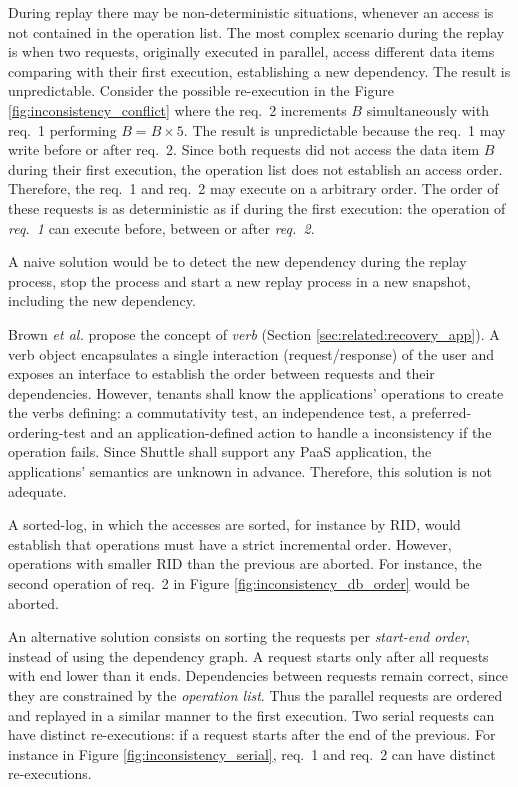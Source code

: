 During replay there may be non-deterministic situations, whenever an access is not contained in the operation list. The most complex scenario during the replay is when two requests, originally executed in parallel, access different data items comparing with their first execution, establishing a new dependency. The result is unpredictable. Consider the possible re-execution in the Figure \ref{fig:inconsistency_conflict} where the {req.~2} increments $B$ simultaneously with {req.~1} performing $B = B \times 5$. The result is unpredictable because the {req.~1} may write before or after {req.~2}. Since both requests did not access the data item $B$ during their first execution, the operation list does not establish an access order. Therefore, the {req.~1} and {req.~2} may execute on a arbitrary order. The order of these requests is as deterministic as if during the first execution: the operation of \emph{req.~1} can execute before, between or after \emph{req.~2}.


A naive solution would be to detect the new dependency during the replay process, stop the process and start a new replay process in a new snapshot, including the new dependency.

Brown \textit{et al.} \cite{undoForOperators} propose the concept of \textit{verb} (Section \ref{sec:related:recovery_app}). A verb object encapsulates a single interaction (request/response) of the user and exposes an interface to establish the order between requests and their dependencies. However, tenants shall know the applications' operations to create the verbs defining: a commutativity test, an independence test, a preferred-ordering-test and an application-defined action to handle a inconsistency if the operation fails. Since Shuttle shall support any \ac{PaaS} application, the applications' semantics are unknown in advance. Therefore, this solution is not adequate.

A sorted-log, in which the accesses are sorted, for instance by \acf{RID}, would establish that operations must have a strict incremental order. However, operations with smaller \ac{RID} than the previous are aborted. For instance, the second operation of {req.~2} in Figure \ref{fig:inconsistency_db_order} would be aborted.

An alternative solution consists on sorting the requests per \emph{start-end order}, instead of using the dependency graph. A request starts only after all requests with end lower than it ends. Dependencies between requests remain correct, since they are constrained by the \emph{operation list}. Thus the parallel requests are ordered and replayed in a similar manner to the first execution. Two serial requests can have distinct re-executions: if a request starts after the end of the previous. For instance in Figure \ref{fig:inconsistency_serial}, {req.~1} and {req.~2} can have distinct re-executions.

